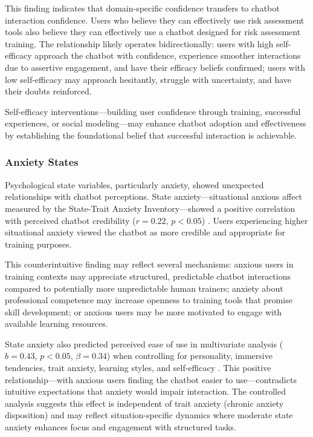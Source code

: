 \documentclass[manuscript,anonymous,sigconf]{acmart}
\begin{document}
This finding indicates that domain-specific confidence transfers to chatbot interaction confidence. Users who believe they can effectively use risk assessment tools also believe they can effectively use a chatbot designed for risk assessment training. The relationship likely operates bidirectionally: users with high self-efficacy approach the chatbot with confidence, experience smoother interactions due to assertive engagement, and have their efficacy beliefs confirmed; users with low self-efficacy may approach hesitantly, struggle with uncertainty, and have their doubts reinforced.

Self-efficacy interventions---building user confidence through training, successful experiences, or social modeling---may enhance chatbot adoption and effectiveness by establishing the foundational belief that successful interaction is achievable.

\subsubsection{Anxiety States}

Psychological state variables, particularly anxiety, showed unexpected relationships with chatbot perceptions. State anxiety---situational anxious affect measured by the State-Trait Anxiety Inventory---showed a positive correlation with perceived chatbot credibility ($r = 0.22$, $p < 0.05$) \cite{A54}. Users experiencing higher situational anxiety viewed the chatbot as more credible and appropriate for training purposes.

This counterintuitive finding may reflect several mechanisms: anxious users in training contexts may appreciate structured, predictable chatbot interactions compared to potentially more unpredictable human trainers; anxiety about professional competence may increase openness to training tools that promise skill development; or anxious users may be more motivated to engage with available learning resources.

State anxiety also predicted perceived ease of use in multivariate analysis ($b = 0.43$, $p < 0.05$, $\beta = 0.34$) when controlling for personality, immersive tendencies, trait anxiety, learning styles, and self-efficacy \cite{A54}. This positive relationship---with anxious users finding the chatbot easier to use---contradicts intuitive expectations that anxiety would impair interaction. The controlled analysis suggests this effect is independent of trait anxiety (chronic anxiety disposition) and may reflect situation-specific dynamics where moderate state anxiety enhances focus and engagement with structured tasks.
\end{document}
